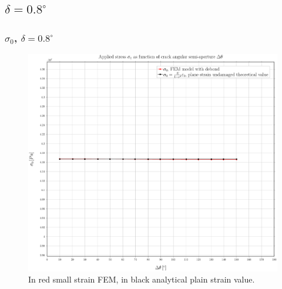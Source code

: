 \documentclass[first,firstsupp,lastsupp,handout,last,hyperref,table]{ETHclass}
\begin{document}


\subsection{$\delta=0.8^{\circ}$}

\begin{frame}
\frametitle{\small $\sigma_{0}$, $\delta=0.8^{\circ}$}
\vspace{-0.5cm}
\centering
\captionsetup[figure]{font=scriptsize,labelfont=scriptsize}
\begin{figure}[!h]
\centering
\includegraphics[height=0.7\textheight]{2017-07-10_AbqRunSummary_SmallStrainD08_sigma-inf_Summary.pdf}
  \caption{\scriptsize In red small strain FEM, in black analytical plain strain value.}
  \label{fig:res1}
\end{figure}
\end{frame}
\end{document}
